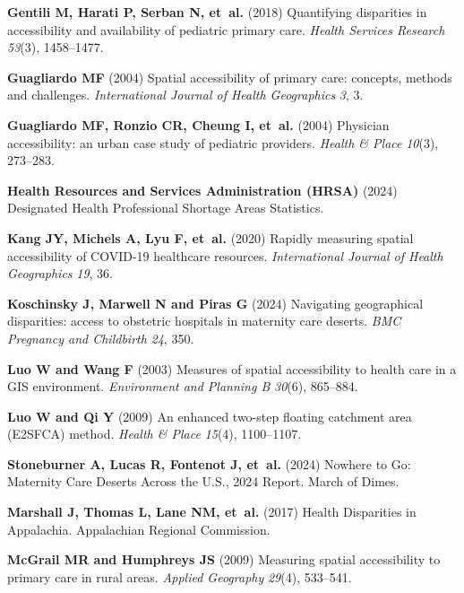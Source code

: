 \documentclass{CUP-JNL-DAP}%
\begin{document}
\begin{Backmatter}
\begin{thebibliography}{}
\textbf{Gentili M, Harati P, Serban N, et~al.} (2018) Quantifying disparities in accessibility and availability of pediatric primary care. \textit{Health Services Research} \textit{53}(3), 1458--1477.

\textbf{Guagliardo MF} (2004) Spatial accessibility of primary care: concepts, methods and challenges. \textit{International Journal of Health Geographics} \textit{3}, 3.

\textbf{Guagliardo MF, Ronzio CR, Cheung I, et~al.} (2004) Physician accessibility: an urban case study of pediatric providers. \textit{Health \& Place} \textit{10}(3), 273--283.

\textbf{Health Resources and Services Administration (HRSA)} (2024) Designated Health Professional Shortage Areas Statistics.

\textbf{Kang JY, Michels A, Lyu F, et~al.} (2020) Rapidly measuring spatial accessibility of COVID-19 healthcare resources. \textit{International Journal of Health Geographics} \textit{19}, 36.

\textbf{Koschinsky J, Marwell N and Piras G} (2024) Navigating geographical disparities: access to obstetric hospitals in maternity care deserts. \textit{BMC Pregnancy and Childbirth} \textit{24}, 350.

\textbf{Luo W and Wang F} (2003) Measures of spatial accessibility to health care in a GIS environment. \textit{Environment and Planning B} \textit{30}(6), 865--884.

\textbf{Luo W and Qi Y} (2009) An enhanced two-step floating catchment area (E2SFCA) method. \textit{Health \& Place} \textit{15}(4), 1100--1107.

\textbf{Stoneburner A, Lucas R, Fontenot J, et~al.} (2024) Nowhere to Go: Maternity Care Deserts Across the U.S., 2024 Report. March of Dimes.

\textbf{Marshall J, Thomas L, Lane NM, et~al.} (2017) Health Disparities in Appalachia. Appalachian Regional Commission.

\textbf{McGrail MR and Humphreys JS} (2009) Measuring spatial accessibility to primary care in rural areas. \textit{Applied Geography} \textit{29}(4), 533--541.


\end{thebibliography}
\end{Backmatter}
\end{document}
